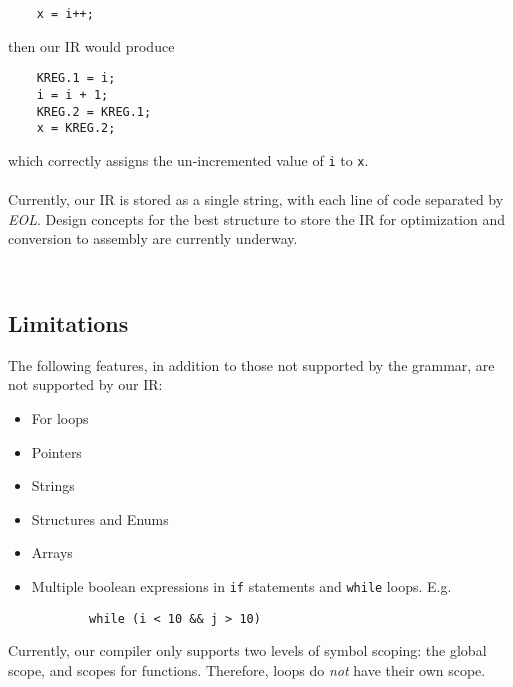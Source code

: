 \documentclass{scrartcl}
\begin{document}
\begin{verbatim}
    x = i++;
\end{verbatim}
then our IR would produce
\begin{verbatim}
    KREG.1 = i;
    i = i + 1;
    KREG.2 = KREG.1;
    x = KREG.2;
\end{verbatim}
which correctly assigns the un-incremented value of \verb|i| to \verb|x|.\\
\\
Currently, our IR is stored as a single string, with each line of code separated by \textit{EOL}. Design concepts for the best structure to store the IR for optimization and conversion to assembly are currently underway.
\begin{verbatim}
    
\end{verbatim}

\subsection{Limitations}
The following features, in addition to those not supported by the grammar, are not supported by our IR:
\begin{itemize}
    \item For loops
    \item Pointers
    \item Strings
    \item Structures and Enums
    \item Arrays
    \item Multiple boolean expressions in \verb|if| statements and \verb|while| loops. E.g. 
    \begin{verbatim}
        while (i < 10 && j > 10)
    \end{verbatim}
\end{itemize}
Currently, our compiler only supports two levels of symbol scoping: the global scope, and scopes for functions. Therefore, loops do \textit{not} have their own scope.
\end{document}
